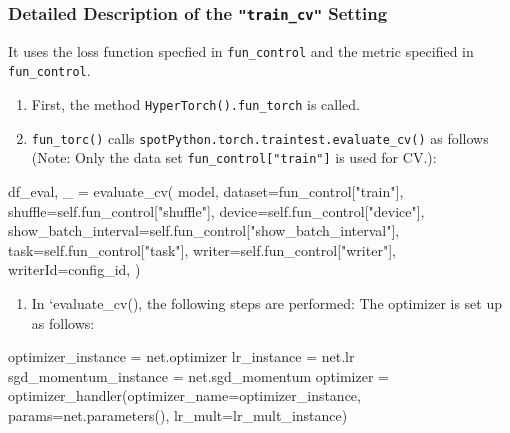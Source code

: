 \documentclass[
  letterpaper,
  DIV=11,
  numbers=noendperiod]{scrreprt}
\newenvironment{Shaded}{\begin{snugshade}}{\end{snugshade}}
\newcommand{\NormalTok}[1]{\textcolor[rgb]{0.00,0.23,0.31}{#1}}
\providecommand{\tightlist}{%
  \setlength{\itemsep}{0pt}\setlength{\parskip}{0pt}}\usepackage{longtable,booktabs,array}
\begin{document}
\hypertarget{detailed-description-of-the-train_cv-setting}{%
\subsubsection{\texorpdfstring{Detailed Description of the
\texttt{"train\_cv"}
Setting}{Detailed Description of the "train\_cv" Setting}}\label{detailed-description-of-the-train_cv-setting}}

It uses the loss function specfied in \texttt{fun\_control} and the
metric specified in \texttt{fun\_control}.

\begin{enumerate}
\def\labelenumi{\arabic{enumi}.}
\tightlist
\item
  First, the method \texttt{HyperTorch().fun\_torch} is called.
\item
  \texttt{fun\_torc()} calls
  \texttt{spotPython.torch.traintest.evaluate\_cv()} as follows (Note:
  Only the data set \texttt{fun\_control{[}"train"{]}} is used for CV.):
\end{enumerate}

\begin{Shaded}
\begin{Highlighting}[]
\NormalTok{df\_eval, \_ = evaluate\_cv(}
\NormalTok{    model,}
\NormalTok{    dataset=fun\_control["train"],}
\NormalTok{    shuffle=self.fun\_control["shuffle"],}
\NormalTok{    device=self.fun\_control["device"],}
\NormalTok{    show\_batch\_interval=self.fun\_control["show\_batch\_interval"],}
\NormalTok{    task=self.fun\_control["task"],}
\NormalTok{    writer=self.fun\_control["writer"],}
\NormalTok{    writerId=config\_id,}
\NormalTok{)}
\end{Highlighting}
\end{Shaded}

\begin{enumerate}
\def\labelenumi{\arabic{enumi}.}
\setcounter{enumi}{2}
\tightlist
\item
  In `evaluate\_cv(), the following steps are performed: The optimizer
  is set up as follows:
\end{enumerate}

\begin{Shaded}
\begin{Highlighting}[]
\NormalTok{optimizer\_instance = net.optimizer}
\NormalTok{lr\_instance = net.lr}
\NormalTok{sgd\_momentum\_instance = net.sgd\_momentum}
\NormalTok{optimizer = optimizer\_handler(optimizer\_name=optimizer\_instance,}
\NormalTok{     params=net.parameters(), lr\_mult=lr\_mult\_instance)}
\end{Highlighting}
\end{Shaded}
\end{document}

